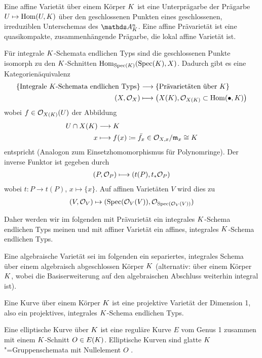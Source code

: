 \documentclass[german]{scrreprt}
\begin{document}
\begin{Definition}[Varietät]
Eine affine Varietät über einem Körper $K$ ist eine Unterprägarbe der Prägarbe 
$U\mapsto \operatorname{Hom}(U,K)$ über den geschlossenen Punkten eines
geschlossenen, irreduziblen Unterschemas des $\A_\K^n$.
Eine affine Prävarietät ist eine quasikompakte, zusammenhängende
Prägarbe, die lokal affine Varietät ist.

Für integrale $K$-Schemata endlichen Typs sind die geschlossenen
Punkte isomorph zu den $K$-Schnitten 
$\operatorname{Hom}_{\operatorname{Spec}(K)}(\operatorname{Spec}(K),X)$.
Dadurch gibt es eine Kategorienäquivalenz
\begin{align*}
  \left\{\text{Integrale $K$-Schemata endlichen Typs}\right\}
  &\longrightarrow
  \left\{\text{Prävarietäten über $K$}\right\}\\
  (X,\mathcal{O}_X) 
  &\longmapsto
    \left( X(K), \mathcal{O}_{X(K)}\subset \operatorname{Hom}(\bullet, K) \right)
\end{align*}
wobei $f\in\mathcal{O}_{X(K)}(U)$ der Abbildung 
\begin{align*}
  U\cap X(K) &\longrightarrow K\\
  x  &\longmapsto f(x)
  \coloneqq \bar{f_x}\in\mathcal{O}_{X,x}/\mathfrak{m}_x\cong K
\end{align*}
entspricht (Analogon zum Einsetzhomomorphismus für Polynomringe).
Der inverse Funktor ist gegeben durch
\begin{align*}
  (P,\mathcal{O}_P) \longmapsto (t(P), t_\ast\mathcal{O}_P) 
\end{align*}
wobei $t\colon P\to t(P)$, $x\mapsto \{x\}$. Auf affinen Varietäten
$V$ wird dies zu
\begin{gather*}
  (V, \mathcal{O}_V) \mapsto (\operatorname{Spec}(\mathcal{O}_V(V)), \mathcal{O}_{\operatorname{Spec}(\mathcal{O}_V(V))})
\end{gather*}
\cite[Theorem 3.37]{wedhorn}

Daher werden wir im folgenden mit Prävarietät ein integrales
$K$-Schema endlichen Typs meinen und mit affiner Varietät ein affines,
integrales $K$-Schema endlichen Typs.

Eine algebraische Varietät sei im folgenden ein separiertes, integrales
Schema über einem algebraisch abgeschlossen Körper $K$
(alternativ: über einem Körper $K$, wobei die Basiserweiterung auf
den algebraischen Abschluss weiterhin integral ist).
\end{Definition}

\begin{Definition}
  Eine Kurve über einem Körper $K$ ist eine projektive Varietät der
  Dimension 1,
  also ein projektives, integrales $K$-Schema endlichen Typs.

  Eine elliptische Kurve über $K$ ist eine reguläre Kurve $E$ vom
  Genus 1 zusammen mit einem $K$-Schnitt $O\in E(K)$.
  Elliptische Kurven sind glatte \cite[Proposition III.3.1]{silverman}
  $K$"=Gruppenschemata mit Nullelement $O$
  \cite{silverman}.
\end{Definition}
\end{document}
